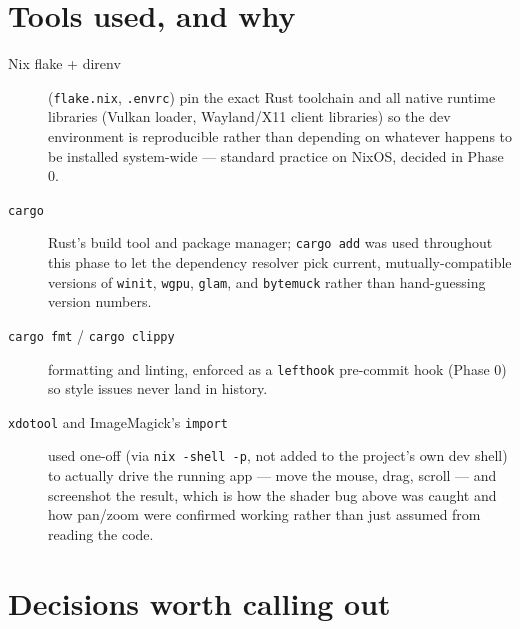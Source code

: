 \documentclass[11pt]{article}
\begin{document}
\section{Tools used, and why}

\begin{description}
  \item[Nix flake + direnv] (\texttt{flake.nix}, \texttt{.envrc}) pin the exact Rust
    toolchain and all native runtime libraries (Vulkan loader, Wayland/X11 client
    libraries) so the dev environment is reproducible rather than depending on whatever
    happens to be installed system-wide — standard practice on NixOS, decided in Phase 0.
  \item[\texttt{cargo}] Rust's build tool and package manager; \texttt{cargo add} was used
    throughout this phase to let the dependency resolver pick current, mutually-compatible
    versions of \texttt{winit}, \texttt{wgpu}, \texttt{glam}, and \texttt{bytemuck} rather
    than hand-guessing version numbers.
  \item[\texttt{cargo fmt} / \texttt{cargo clippy}] formatting and linting, enforced as a
    \texttt{lefthook} pre-commit hook (Phase 0) so style issues never land in history.
  \item[\texttt{xdotool} and ImageMagick's \texttt{import}] used one-off (via \texttt{nix
    -shell -p}, not added to the project's own dev shell) to actually drive the running app
    — move the mouse, drag, scroll — and screenshot the result, which is how the shader bug
    above was caught and how pan/zoom were confirmed working rather than just assumed from
    reading the code.
\end{description}

\section{Decisions worth calling out}
\label{sec:verification}
\end{document}
